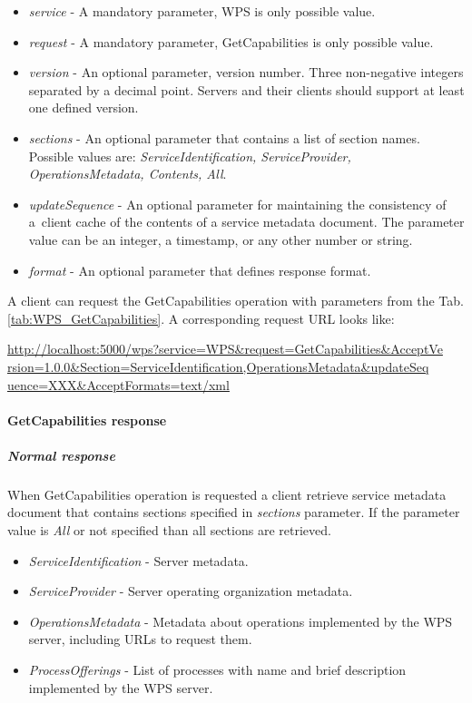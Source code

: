 \begin{itemize}
\item\textit{service} - A mandatory parameter, WPS is only possible value.
\item\textit{request} - A mandatory parameter, GetCapabilities is only possible value.
\item\textit{version} - An optional parameter, version number. Three non-negative integers separated by a decimal point. Servers and
their clients should support at least one defined version.
\item\textit{sections} - An optional parameter that contains a list of section names. Possible values are: \textit{ServiceIdentification,
ServiceProvider, OperationsMetadata, Contents, All}.
\item\textit{updateSequence} - An optional parameter for maintaining the consistency of a~client cache of the contents of a service
metadata document. The parameter value can be an integer, a timestamp, or any other number or string.
\item\textit{format} - An optional parameter that defines response format.
\end{itemize}

A client can request the GetCapabilities operation with parameters from the Tab. \ref{tab:WPS_GetCapabilities}. A corresponding
request URL looks like:

\noindent
\url{http://localhost:5000/wps?service=WPS&request=GetCapabilities&AcceptVe}\\
\url{rsion=1.0.0&Section=ServiceIdentification,OperationsMetadata&updateSeq}\\
\url{uence=XXX&AcceptFormats=text/xml}

\paragraph{GetCapabilities response}
\label{para:GetCapa_response}
\subparagraph{Normal response}
When GetCapabilities operation is requested a client retrieve service metadata document that contains sections specified in
\textit{sections} parameter. If the parameter value is \textit{All} or not specified than all sections are retrieved.

\begin{itemize}
\item\textit{ServiceIdentification} - Server metadata.
\item\textit{ServiceProvider} - Server operating organization metadata.
\item\textit{OperationsMetadata} - Metadata about operations implemented by the WPS server, including URLs to request them.
\item\textit{ProcessOfferings} - List of processes with name and brief description implemented by the WPS server.
\end{itemize}

